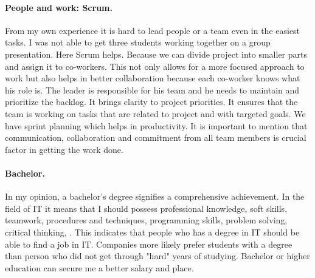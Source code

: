 \documentclass[10pt,a4paper]{article}
\begin{document}
\paragraph{People and work: Scrum.}
From my own experience it is hard to lead people or a team even in the easiest tasks. I was not able to get three students working together on a group presentation. Here Scrum helps. Because we can divide project into smaller parts and assign it to co-workers. This not only allows for a more focused approach to work but also helps in better collaboration because each co-worker knows what his role is. The leader is responsible for his team and he needs to maintain and prioritize the backlog. It brings clarity to project priorities. It ensures that the team is working on tasks that are related to project and with targeted goals. We have sprint planning which helps in productivity. It is important to mention that communication, collaboration and commitment from all team members is crucial factor in getting the work done.
\\
\paragraph{Bachelor.}
In my opinion, a bachelor's degree signifies a comprehensive achievement.  In the field of IT it means that I should possess professional knowledge, soft skills, teamwork, procedures and techniques, programming skills, problem solving, critical thinking, . This indicates that people who has a degree in IT should be able to find a job in IT. Companies more likely prefer students with a degree than person who did not get through "hard" years of studying. Bachelor or higher education can secure me a better salary and place.



\end{document}
